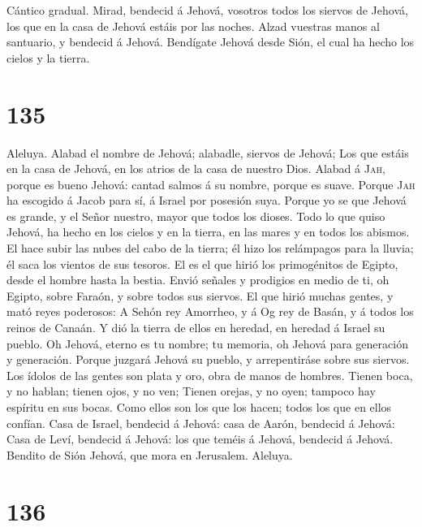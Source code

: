  Cántico gradual. Mirad, bendecid á Jehová, vosotros todos
los siervos de Jehová, los que en la casa de Jehová estáis por las
noches.  Alzad vuestras manos al santuario, y bendecid á
Jehová.  Bendígate Jehová desde Sión, el cual ha hecho los
cielos y la tierra.

\hypertarget{section-134}{%
\section{135}\label{section-134}}

 Aleluya. Alabad el nombre de Jehová; alabadle, siervos de
Jehová;  Los que estáis en la casa de Jehová, en los
atrios de la casa de nuestro Dios.  Alabad á \textsc{Jah},
porque es bueno Jehová: cantad salmos á su nombre, porque es suave.
 Porque \textsc{Jah} ha escogido á Jacob para sí, á Israel
por posesión suya.  Porque yo se que Jehová es grande, y
el Señor nuestro, mayor que todos los dioses.  Todo lo que
quiso Jehová, ha hecho en los cielos y en la tierra, en las mares y en
todos los abismos.  El hace subir las nubes del cabo de la
tierra; él hizo los relámpagos para la lluvia; él saca los vientos de
sus tesoros.  El es el que hirió los primogénitos de
Egipto, desde el hombre hasta la bestia.  Envió señales y
prodigios en medio de ti, oh Egipto, sobre Faraón, y sobre todos sus
siervos.  El que hirió muchas gentes, y mató reyes
poderosos:  A Sehón rey Amorrheo, y á Og rey de Basán, y
á todos los reinos de Canaán.  Y dió la tierra de ellos
en heredad, en heredad á Israel su pueblo.  Oh Jehová,
eterno es tu nombre; tu memoria, oh Jehová para generación y generación.
 Porque juzgará Jehová su pueblo, y arrepentiráse sobre
sus siervos.  Los ídolos de las gentes son plata y oro,
obra de manos de hombres.  Tienen boca, y no hablan;
tienen ojos, y no ven;  Tienen orejas, y no oyen; tampoco
hay espíritu en sus bocas.  Como ellos son los que los
hacen; todos los que en ellos confían.  Casa de Israel,
bendecid á Jehová: casa de Aarón, bendecid á Jehová: 
Casa de Leví, bendecid á Jehová: los que teméis á Jehová, bendecid á
Jehová.  Bendito de Sión Jehová, que mora en Jerusalem.
Aleluya.

\hypertarget{section-135}{%
\section{136}\label{section-135}}

